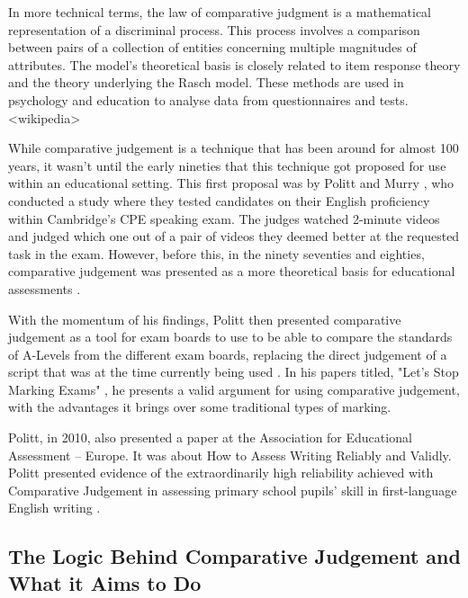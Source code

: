 		In more technical terms, the law of comparative judgment is a mathematical representation of a discriminal process. This process involves a comparison between pairs of a collection of entities concerning multiple magnitudes of attributes. The model's theoretical basis is closely related to item response theory and the theory underlying the Rasch model. These methods are used in psychology and education to analyse data from questionnaires and tests.
		<wikipedia>
		
		While comparative judgement is a technique that has been around for almost 100 years, it wasn't until the early nineties that this technique got proposed for use within an educational setting. This first proposal was by Politt and Murry \cite{pollitt1996raters}, who conducted a study where they tested candidates on their English proficiency within Cambridge's CPE speaking exam. The judges watched 2-minute videos and judged which one out of a pair of videos they deemed better at the requested task in the exam. However, before this, in the ninety seventies and eighties, comparative judgement was presented as a more theoretical basis for educational assessments \cite{andrich1978rating}. 
		
		With the momentum of his findings, Politt then presented comparative judgement as a tool for exam boards to use to be able to compare the standards of A-Levels from the different exam boards, replacing the direct judgement of a script that was at the time currently being used \cite{newton2007paired}. In his papers titled, "Let's Stop Marking Exams" \cite{stop_marking_pollitt}, he presents a valid argument for using comparative judgement, with the advantages it brings over some traditional types of marking.
		
		Politt, in 2010, also presented a paper at the Association for Educational Assessment – Europe. It was about How to Assess Writing Reliably and Validly. Politt presented evidence of the extraordinarily high reliability achieved with Comparative Judgement in assessing primary school pupils' skill in first-language English writing \cite{pollitt2009abolishing}.
		
	\subsection{The Logic Behind Comparative Judgement and What it Aims to Do} %
		
